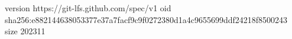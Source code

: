 version https://git-lfs.github.com/spec/v1
oid sha256:e882144638053377e37a7facf9c9f0272380d1a4c9655699ddf24218f8500243
size 202311
